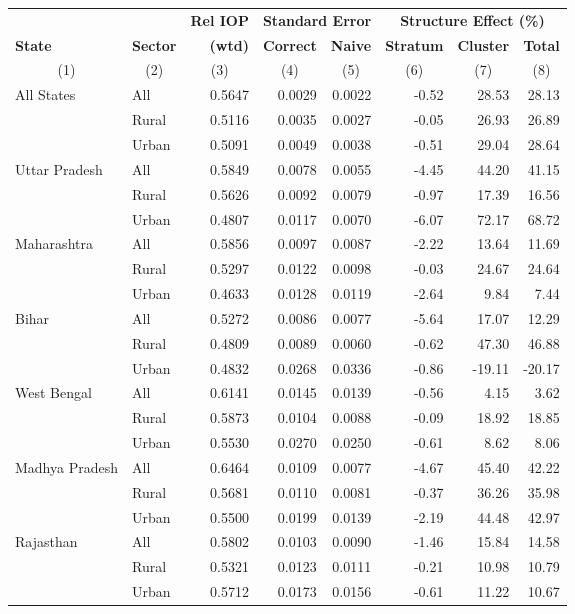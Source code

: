 
\begin{tabular}{llrrrrrr}
\toprule
\multicolumn{2}{c}{\textbf{ }} & \multicolumn{1}{c}{\textbf{Rel IOP}} & \multicolumn{2}{c}{\textbf{Standard Error}} & \multicolumn{3}{c}{\textbf{Structure Effect (\%)}} \\
\cmidrule(l{3pt}r{3pt}){3-3} \cmidrule(l{3pt}r{3pt}){4-5} \cmidrule(l{3pt}r{3pt}){6-8}
\textbf{State} & \textbf{Sector} & \textbf{(wtd)} & \textbf{Correct} & \textbf{Naive} & \textbf{Stratum} & \textbf{Cluster} & \textbf{Total}\\
\multicolumn{1}{c}{(1)} & \multicolumn{1}{c}{(2)} & \multicolumn{1}{c}{(3)} & \multicolumn{1}{c}{(4)} & \multicolumn{1}{c}{(5)} & \multicolumn{1}{c}{(6)} & \multicolumn{1}{c}{(7)} & \multicolumn{1}{c}{(8)} \\
\midrule
All States & All & 0.5647 & 0.0029 & 0.0022 & -0.52 & 28.53 & 28.13\\
 & Rural & 0.5116 & 0.0035 & 0.0027 & -0.05 & 26.93 & 26.89\\
 & Urban & 0.5091 & 0.0049 & 0.0038 & -0.51 & 29.04 & 28.64\\
\addlinespace
Uttar Pradesh & All & 0.5849 & 0.0078 & 0.0055 & -4.45 & 44.20 & 41.15\\
 & Rural & 0.5626 & 0.0092 & 0.0079 & -0.97 & 17.39 & 16.56\\
 & Urban & 0.4807 & 0.0117 & 0.0070 & -6.07 & 72.17 & 68.72\\
\addlinespace
Maharashtra & All & 0.5856 & 0.0097 & 0.0087 & -2.22 & 13.64 & 11.69\\
 & Rural & 0.5297 & 0.0122 & 0.0098 & -0.03 & 24.67 & 24.64\\
 & Urban & 0.4633 & 0.0128 & 0.0119 & -2.64 & 9.84 & 7.44\\
\addlinespace
Bihar & All & 0.5272 & 0.0086 & 0.0077 & -5.64 & 17.07 & 12.29\\
 & Rural & 0.4809 & 0.0089 & 0.0060 & -0.62 & 47.30 & 46.88\\
 & Urban & 0.4832 & 0.0268 & 0.0336 & -0.86 & -19.11 & -20.17\\
\addlinespace
West Bengal & All & 0.6141 & 0.0145 & 0.0139 & -0.56 & 4.15 & 3.62\\
 & Rural & 0.5873 & 0.0104 & 0.0088 & -0.09 & 18.92 & 18.85\\
 & Urban & 0.5530 & 0.0270 & 0.0250 & -0.61 & 8.62 & 8.06\\
\addlinespace
Madhya Pradesh & All & 0.6464 & 0.0109 & 0.0077 & -4.67 & 45.40 & 42.22\\
 & Rural & 0.5681 & 0.0110 & 0.0081 & -0.37 & 36.26 & 35.98\\
 & Urban & 0.5500 & 0.0199 & 0.0139 & -2.19 & 44.48 & 42.97\\
\addlinespace
Rajasthan & All & 0.5802 & 0.0103 & 0.0090 & -1.46 & 15.84 & 14.58\\
 & Rural & 0.5321 & 0.0123 & 0.0111 & -0.21 & 10.98 & 10.79\\
 & Urban & 0.5712 & 0.0173 & 0.0156 & -0.61 & 11.22 & 10.67\\
\bottomrule
\end{tabular}
